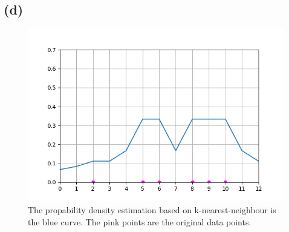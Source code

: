 \documentclass[a4paper]{scrartcl}
\begin{document}
\subsection*{(d)} 
\begin{figure}[H]
	\includegraphics*{assignment6_data/q2c_plot.png}
	\caption{The propability density estimation based on k-nearest-neighbour is the blue curve. The pink points are the original data points.}
\end{figure}
\end{document}
